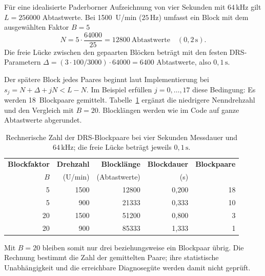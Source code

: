 \clearpage
{}
\label{app:drs_mittelungen}

Für eine idealisierte Paderborner Aufzeichnung von vier Sekunden mit
$64\,\mathrm{kHz}$ gilt $L=256000$ Abtastwerte. Bei 1500~U/min
($25\,\mathrm{Hz}$) umfasst ein Block mit dem ausgewählten Faktor $B=5$
\[
  N=5\cdot\frac{64000}{25}=12800\ \text{Abtastwerte}
  \quad (0{,}2\,\mathrm{s}).
\]
Die freie Lücke zwischen den gepaarten Blöcken beträgt mit den festen
DRS-Parametern $\Delta=(3\cdot100/3000)\cdot64000=6400$
Abtastwerte, also $0{,}1\,\mathrm{s}$.

Der spätere Block jedes Paares beginnt laut Implementierung bei
$s_j=N+\Delta+jN<L-N$. Im Beispiel erfüllen $j=0,\ldots,17$
diese Bedingung: Es werden 18~Blockpaare gemittelt.
Tabelle~\ref{tab:drs_mittelungen} ergänzt die niedrigere Nenndrehzahl und
den Vergleich mit $B=20$. Blocklängen werden wie im Code auf ganze
Abtastwerte abgerundet.

\begin{table}[H]
  \centering
  \caption{Rechnerische Zahl der DRS-Blockpaare bei vier Sekunden Messdauer
    und $64\,\mathrm{kHz}$; die freie Lücke beträgt jeweils $0{,}1\,\mathrm{s}$.}
  \label{tab:drs_mittelungen}
  \small
  \begin{tabular}{rrrrr}
    \hline
    \textbf{Blockfaktor} & \textbf{Drehzahl} & \textbf{Blocklänge} &
      \textbf{Blockdauer} & \textbf{Blockpaare} \\
    $B$ & (U/min) & (Abtastwerte) & (s) & \\
    \hline
    5 & 1500 & 12800 & 0,200 & 18 \\
    5 & 900 & 21333 & 0,333 & 10 \\
    20 & 1500 & 51200 & 0,800 & 3 \\
    20 & 900 & 85333 & 1,333 & 1 \\
    \hline
  \end{tabular}
\end{table}
Mit $B=20$ bleiben somit nur drei beziehungsweise ein Blockpaar übrig.
Die Rechnung bestimmt die Zahl der gemittelten Paare; ihre statistische
Unabhängigkeit und die erreichbare Diagnosegüte werden damit nicht geprüft.



